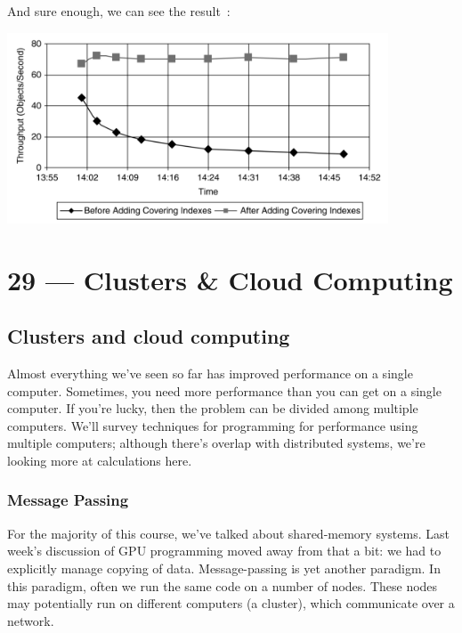 \documentclass[a4paper]{report}
\begin{document}
And sure enough, we can see the result~\cite{swps}:

\begin{center}
	\includegraphics[width=0.85\textwidth]{images/adding-indexes.png}
\end{center}










\chapter*{29 --- Clusters \& Cloud Computing}


\section*{Clusters and cloud computing}
Almost everything we've seen so far has improved performance on a single
computer. Sometimes, you need more performance than you can get on a
single computer. If you're lucky, then the problem can be divided
among multiple computers. We'll survey techniques for programming for
performance using multiple computers; although there's overlap with
distributed systems, we're looking more at calculations here.

\subsection*{Message Passing} For the majority of this course, 
we've talked about shared-memory systems. Last week's discussion of
GPU programming moved away from that a bit: we had to explicitly
manage copying of data. Message-passing is yet another paradigm.  In
this paradigm, often we run the same code on a number of nodes. These
nodes may potentially run on different computers (a cluster),
which communicate over a network.
\end{document}
